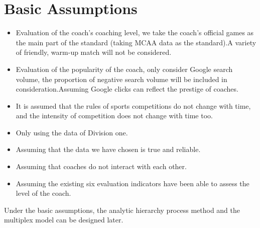 \documentclass{mcmthesis}
\begin{document}
\section{Basic Assumptions} 
\begin{itemize}
\item Evaluation of the coach's coaching level, we take the coach's official games as the main part of the standard (taking MCAA data as the standard).A variety of friendly, warm-up match will not be considered.
\item Evaluation of the popularity of the coach, only consider Google search volume,  the proportion of negative search volume will be included in consideration.Assuming Google clicks can reflect the prestige of coaches.
\item It is assumed that the rules of sports competitions do not change with time, and the intensity of competition does not change with time too.
\item Only using the data of Division one.
\item Assuming that the data we have chosen is true and reliable.
\item Assuming that coaches do not interact with each other.
\item Assuming the existing six evaluation indicators have been able to assess the level of the coach.
\end{itemize}

\par Under the basic assumptions, the analytic hierarchy process method and the multiplex model can be designed later.
\end{document}
